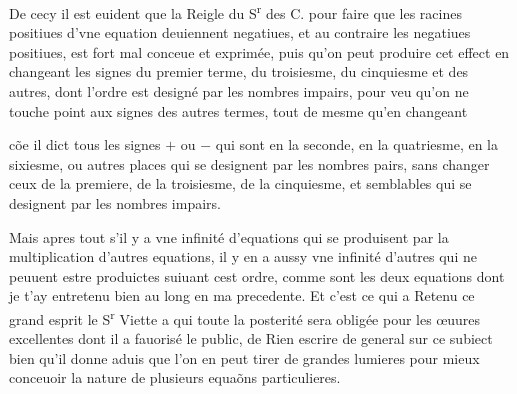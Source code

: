 \documentclass[11pt,a4paper]{article}
\begin{document}
De cecy il est euident que la Reigle du S\textsuperscript{r} des C. pour faire que les racines positiues d'vne equation deuiennent negatiues, et au contraire les negatiues positiues, est fort mal conceue et exprimée, puis qu'on peut produire cet effect en changeant les signes du premier terme, du troisiesme, du cinquiesme et des autres, dont l'ordre est designé par les nombres impairs, pour veu qu'on ne touche point aux signes des autres termes, tout de mesme qu'en changeant


cõe il dict tous les signes $+$ ou $-$ qui sont en la seconde, en la quatriesme, en la sixiesme, ou autres places qui se designent par les nombres pairs, sans changer ceux de la premiere, de la troisiesme, de la cinquiesme, et semblables qui se designent par les nombres impairs.

Mais apres tout s'il y a vne infinité d'equations qui se produisent par la multiplication d'autres equations, il y \struck{\ill{}} en a aussy vne infinité d'autres qui ne peuuent estre produictes suiuant cest ordre, comme sont les deux equations dont je t'ay entretenu bien au long en ma precedente. Et c'est ce qui a Retenu ce grand esprit le S\textsuperscript{r} Viette a qui toute la posterité sera obligée pour les œuures excellentes dont il a  fauorisé le public, de Rien escrire de general sur ce subiect bien qu'il donne aduis que l'on en peut tirer de grandes lumieres pour mieux conceuoir la nature de plusieurs equaõns particulieres.
\end{document}
